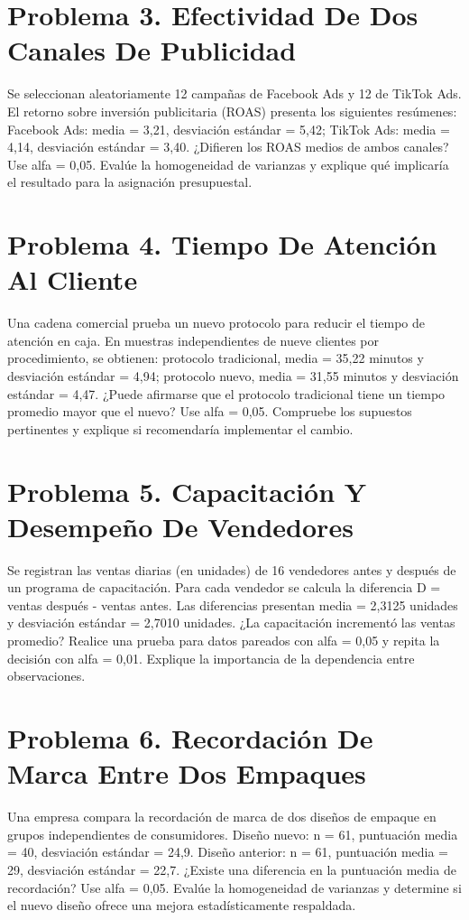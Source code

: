 \documentclass[11pt,letterpaper]{article}
\begin{document}
\section*{Problema 3. Efectividad De Dos Canales De Publicidad}
Se seleccionan aleatoriamente 12 campañas de Facebook Ads y 12 de TikTok Ads. El retorno sobre inversión publicitaria (ROAS) presenta los siguientes resúmenes: Facebook Ads: media = 3,21, desviación estándar = 5,42; TikTok Ads: media = 4,14, desviación estándar = 3,40. ¿Difieren los ROAS medios de ambos canales? Use alfa = 0,05. Evalúe la homogeneidad de varianzas y explique qué implicaría el resultado para la asignación presupuestal.

\section*{Problema 4. Tiempo De Atención Al Cliente}
Una cadena comercial prueba un nuevo protocolo para reducir el tiempo de atención en caja. En muestras independientes de nueve clientes por procedimiento, se obtienen: protocolo tradicional, media = 35,22 minutos y desviación estándar = 4,94; protocolo nuevo, media = 31,55 minutos y desviación estándar = 4,47. ¿Puede afirmarse que el protocolo tradicional tiene un tiempo promedio mayor que el nuevo? Use alfa = 0,05. Compruebe los supuestos pertinentes y explique si recomendaría implementar el cambio.

\section*{Problema 5. Capacitación Y Desempeño De Vendedores}
Se registran las ventas diarias (en unidades) de 16 vendedores antes y después de un programa de capacitación. Para cada vendedor se calcula la diferencia D = ventas después - ventas antes. Las diferencias presentan media = 2,3125 unidades y desviación estándar = 2,7010 unidades. ¿La capacitación incrementó las ventas promedio? Realice una prueba para datos pareados con alfa = 0,05 y repita la decisión con alfa = 0,01. Explique la importancia de la dependencia entre observaciones.

\section*{Problema 6. Recordación De Marca Entre Dos Empaques}
Una empresa compara la recordación de marca de dos diseños de empaque en grupos independientes de consumidores. Diseño nuevo: n = 61, puntuación media = 40, desviación estándar = 24,9. Diseño anterior: n = 61, puntuación media = 29, desviación estándar = 22,7. ¿Existe una diferencia en la puntuación media de recordación? Use alfa = 0,05. Evalúe la homogeneidad de varianzas y determine si el nuevo diseño ofrece una mejora estadísticamente respaldada.
\end{document}
